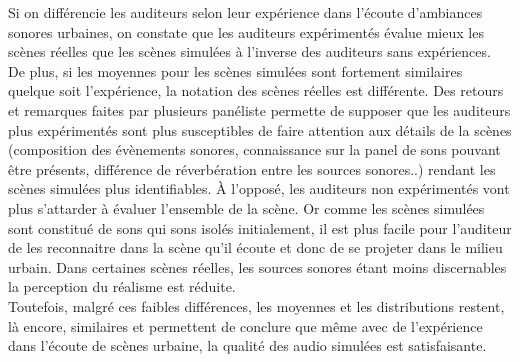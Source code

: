 


Si on différencie les auditeurs selon leur expérience dans l'écoute d'ambiances sonores urbaines, on constate que les auditeurs expérimentés évalue mieux les scènes réelles que les scènes simulées à l'inverse des auditeurs sans expériences. De plus, si les moyennes pour les scènes simulées sont fortement similaires quelque soit l'expérience, la notation des scènes réelles est différente. Des retours et remarques faites par plusieurs panéliste permette de supposer que les auditeurs plus expérimentés sont plus susceptibles de faire attention aux détails de la scènes (composition des évènements sonores, connaissance sur la panel de sons pouvant être présents, différence de réverbération entre les sources sonores..) rendant les scènes simulées plus identifiables. À l'opposé, les auditeurs non expérimentés vont plus s'attarder à évaluer l'ensemble de la scène. Or comme les scènes simulées sont constitué de sons qui sons isolés initialement, il est plus facile pour l'auditeur de les reconnaitre dans la scène qu'il écoute et donc de se \og  projeter \fg{} dans le milieu urbain. Dans certaines scènes réelles, les sources sonores étant moins discernables la perception du réalisme est réduite.\\

Toutefois, malgré ces faibles différences, les moyennes et les distributions restent, là encore, similaires et permettent de conclure que même avec de l'expérience dans l'écoute de scènes urbaine, la qualité des audio simulées est satisfaisante.\\

